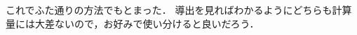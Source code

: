 \documentclass[a4paper,10pt]{ltjsarticle}
\begin{document}
\begin{multicols}{2}
  これでふた通りの方法でもとまった．
  導出を見ればわかるようにどちらも計算量には大差ないので，お好みで使い分けると良いだろう．


  \newpage
\end{multicols}
\end{document}
